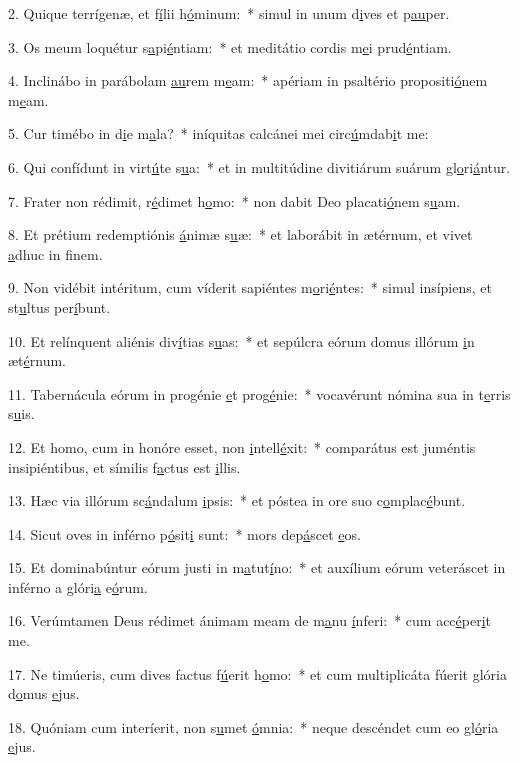 2. Quique terrígenæ, et f\uline{í}lii h\uline{ó}minum:~* simul in unum d\uline{i}ves et p\uline{au}per.\par 
3. Os meum loquétur s\uline{a}pi\uline{é}ntiam:~* et meditátio cordis m\uline{e}i prud\uline{é}ntiam.\par 
4. Inclinábo in parábolam \uline{au}rem m\uline{e}am:~* apériam in psaltério propositi\uline{ó}nem m\uline{e}am.\par 
5. Cur timébo in d\uline{i}e m\uline{a}la?~* iníquitas calcánei mei circ\uline{ú}mdab\uline{i}t me:\par 
6. Qui confídunt in virt\uline{ú}te s\uline{u}a:~* et in multitúdine divitiárum suárum gl\uline{o}ri\uline{á}ntur.\par 
7. Frater non rédimit, r\uline{é}dimet h\uline{o}mo:~* non dabit Deo placati\uline{ó}nem s\uline{u}am.\par 
8. Et prétium redemptiónis \uline{á}nimæ s\uline{u}æ:~* et laborábit in ætérnum, et vivet \uline{a}dhuc in f\uline{i}nem.\par 
9. Non vidébit intéritum, cum víderit sapiéntes m\uline{o}ri\uline{é}ntes:~* simul insípiens, et st\uline{u}ltus per\uline{í}bunt.\par 
10. Et relínquent aliénis div\uline{í}tias s\uline{u}as:~* et sepúlcra eórum domus illórum \uline{i}n æt\uline{é}rnum.\par 
11. Tabernácula eórum in progénie \uline{e}t prog\uline{é}nie:~* vocavérunt nómina sua in t\uline{e}rris s\uline{u}is.\par 
12. Et homo, cum in honóre esset, non \uline{i}ntell\uline{é}xit:~* comparátus est juméntis insipiéntibus, et símilis f\uline{a}ctus est \uline{i}llis.\par 
13. Hæc via illórum sc\uline{á}ndalum \uline{i}psis:~* et póstea in ore suo c\uline{o}mplac\uline{é}bunt.\par 
14. Sicut oves in inférno p\uline{ó}sit\uline{i} sunt:~* mors dep\uline{á}scet \uline{e}os.\par 
15. Et dominabúntur eórum justi in m\uline{a}tut\uline{í}no:~* et auxílium eórum veteráscet in inférno a glóri\uline{a} e\uline{ó}rum.\par 
16. Verúmtamen Deus rédimet ánimam meam de m\uline{a}nu \uline{í}nferi:~* cum acc\uline{é}per\uline{i}t me.\par 
17. Ne timúeris, cum dives factus f\uline{ú}erit h\uline{o}mo:~* et cum multiplicáta fúerit glória d\uline{o}mus \uline{e}jus.\par 
18. Quóniam cum interíerit, non s\uline{u}met \uline{ó}mnia:~* neque descéndet cum eo gl\uline{ó}ria \uline{e}jus.\par 
